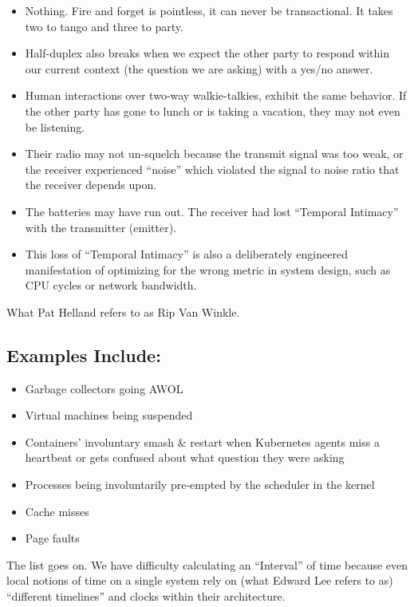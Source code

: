 \begin{itemize}
  \item Nothing. Fire and forget is pointless, it can never be transactional. It takes two to tango and three to party.
  \item Half-duplex also breaks when we expect the other party to respond within our current context (the question we are asking) with a yes/no answer. 
  \item Human interactions over two-way walkie-talkies, exhibit the same behavior. If the other party has gone to lunch or is taking a vacation, they may not even be listening. 
  \item Their radio may not un-squelch because the transmit signal was too weak, or the receiver experienced  “noise” which violated the signal to noise ratio that the receiver depends upon. 
  \item The batteries may have run out. The receiver had lost “Temporal Intimacy” with the transmitter (emitter). 
  \item This loss of “Temporal Intimacy” is also a deliberately engineered manifestation of optimizing  for the wrong metric in system design, such as CPU cycles or network bandwidth.
\end{itemize}

What Pat Helland refers to as Rip Van Winkle.

\subsection{Examples Include:}
\begin{itemize}
  \item Garbage collectors going AWOL
  \item Virtual machines being suspended
  \item Containers’ involuntary smash \& restart when Kubernetes agents miss a heartbeat or gets confused about what question they were asking
  \item Processes being involuntarily pre-empted by the scheduler in the kernel
  \item Cache misses
  \item Page faults
\end{itemize}

The list goes on. We have difficulty calculating an “Interval” of time because even local notions of time on a single system rely on (what Edward Lee refers to as) “different timelines” and clocks within their architecture.

